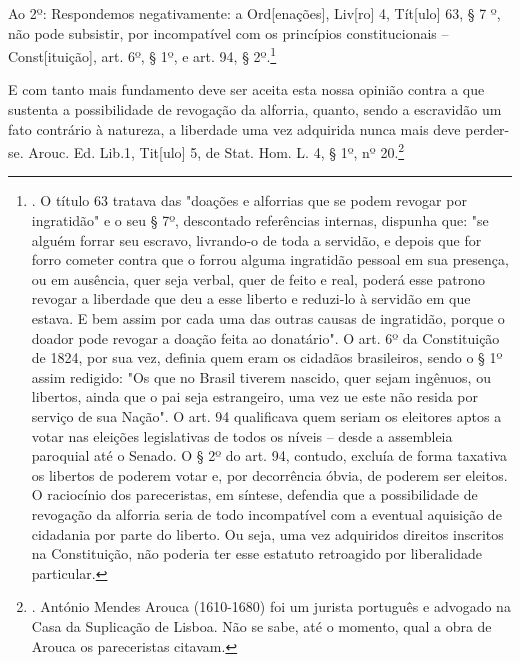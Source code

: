 Ao 2º: Respondemos negativamente: a Ord{[}enações{]}, Liv{[}ro{]} 4,
Tít{[}ulo{]} 63, § 7 º, não pode subsistir, por incompatível com os
princípios constitucionais -- Const{[}ituição{]}, art. 6º, § 1º, e art.
94, § 2º.\footnote{. O título 63 tratava das "doações e alforrias que se
  podem revogar por ingratidão" e o seu § 7º, descontado referências
  internas, dispunha que: "se alguém forrar seu escravo, livrando-o de
  toda a servidão, e depois que for forro cometer contra que o forrou
  alguma ingratidão pessoal em sua presença, ou em ausência, quer seja
  verbal, quer de feito e real, poderá esse patrono revogar a liberdade
  que deu a esse liberto e reduzi-lo à servidão em que estava. E bem
  assim por cada uma das outras causas de ingratidão, porque o doador
  pode revogar a doação feita ao donatário". O art. 6º da Constituição
  de 1824, por sua vez, definia quem eram os cidadãos brasileiros, sendo
  o § 1º assim redigido: "Os que no Brasil tiverem nascido, quer sejam
  ingênuos, ou libertos, ainda que o pai seja estrangeiro, uma vez ue
  este não resida por serviço de sua Nação". O art. 94 qualificava quem
  seriam os eleitores aptos a votar nas eleições legislativas de todos
  os níveis -- desde a assembleia paroquial até o Senado. O § 2º do art.
  94, contudo, excluía de forma taxativa os libertos de poderem votar e,
  por decorrência óbvia, de poderem ser eleitos. O raciocínio dos
  pareceristas, em síntese, defendia que a possibilidade de revogação da
  alforria seria de todo incompatível com a eventual aquisição de
  cidadania por parte do liberto. Ou seja, uma vez adquiridos direitos
  inscritos na Constituição, não poderia ter esse estatuto retroagido
  por liberalidade particular.}

E com tanto mais fundamento deve ser aceita esta nossa opinião contra a
que sustenta a possibilidade de revogação da alforria, quanto, sendo a
escravidão um fato contrário à natureza, a liberdade uma vez adquirida
nunca mais deve perder-se. Arouc. Ed. Lib.1, Tit{[}ulo{]} 5, de Stat.
Hom. L. 4, § 1º, nº 20.\footnote{. António Mendes Arouca (1610-1680) foi
  um jurista português e advogado na Casa da Suplicação de Lisboa. Não
  se sabe, até o momento, qual a obra de Arouca os pareceristas citavam.}

